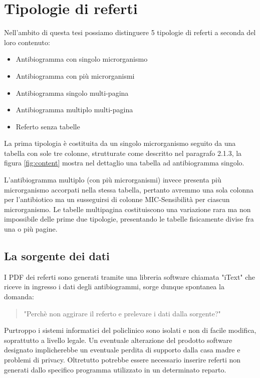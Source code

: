 \section{Tipologie di referti}
Nell'ambito di questa tesi possiamo distinguere 5 tipologie di referti a seconda del loro contenuto:
\begin{itemize}
	\item Antibiogramma con singolo microrganismo
	\item Antibiogramma con più microrganismi
	\item Antibiogramma singolo multi-pagina
	\item Antibiogramma multiplo multi-pagina
	\item Referto senza tabelle
\end{itemize}
\bigskip
La prima tipologia è costituita da un singolo microrganismo seguito da una tabella con sole tre colonne, strutturate come descritto nel paragrafo 2.1.3, la figura \ref{fig:content} mostra nel dettaglio una tabella ad antibiogramma singolo.
 
L'antibiogramma multiplo (con più microrganismi) invece presenta più microrganismo accorpati nella stessa tabella, pertanto avremmo una sola colonna per l'antibiotico ma un susseguirsi di colonne MIC-Sensibilità per ciascun microrganismo.
Le tabelle multipagina costituiscono una variazione rara ma non impossibile delle prime due tipologie, presentando le tabelle fisicamente divise fra una o più pagine.

\subsection{La sorgente dei dati}
I PDF dei referti sono generati tramite una libreria software chiamata "iText" che riceve in ingresso i dati degli antibiogrammi, sorge dunque spontanea la domanda: 
\begin{quotation}
  "Perchè non aggirare il referto e prelevare i dati dalla sorgente?"
\end{quotation}
Purtroppo i sistemi informatici del policlinico sono isolati e non di facile modifica, soprattutto a livello legale. Un eventuale alterazione del prodotto software designato implicherebbe un eventuale perdita di supporto dalla casa madre e problemi di privacy. Oltretutto potrebbe essere necessario inserire referti non generati dallo specifico programma utilizzato in un determinato reparto.




